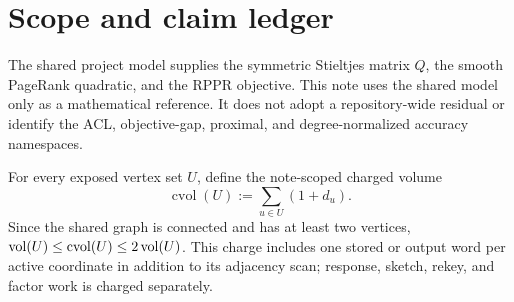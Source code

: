 \section{Scope and claim ledger}
\label{sec:scope}



The shared project model supplies the symmetric Stieltjes matrix $Q$, the
smooth PageRank quadratic, and the RPPR objective.  This note uses the shared
model only as a mathematical reference.  It does not adopt a repository-wide
residual or identify the ACL, objective-gap, proximal, and degree-normalized
accuracy namespaces.

For every exposed vertex set $U$, define the note-scoped charged volume
\begin{equation}
 \operatorname{cvol}(U):=\sum_{u\in U}(1+d_u).
 \label{eq:charged-volume}
\end{equation}
Since the shared graph is connected and has at least two vertices,
$\operatorname{vol}(U)\leq\operatorname{cvol}(U)\leq2\operatorname{vol}(U)$.  This charge includes one
stored or output word per active coordinate in addition to its adjacency
scan; response, sketch, rekey, and factor work is charged separately.

